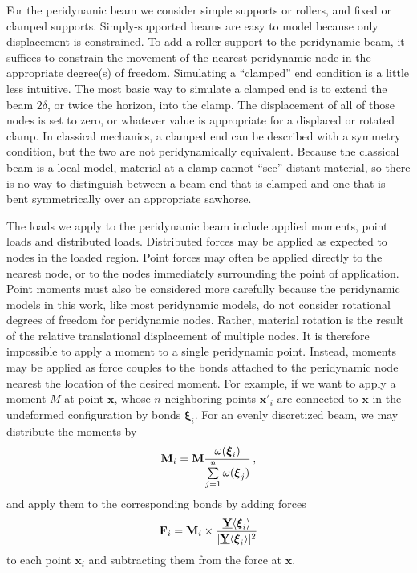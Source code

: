 For the peridynamic beam we consider simple supports or rollers, and fixed or clamped supports.
Simply-supported beams are easy to model because only displacement is constrained.
To add a roller support to the peridynamic beam, it suffices to constrain the movement of the nearest peridynamic node in the appropriate degree(s) of freedom.
Simulating a ``clamped'' end condition is a little less intuitive. 
The most basic way to simulate a clamped end is to extend the beam \(2\delta\), or twice the horizon, into the clamp. The displacement of all of those nodes is set to zero, or whatever value is appropriate for a displaced or rotated clamp.
In classical mechanics, a clamped end can be described with a symmetry condition, but the two are not peridynamically equivalent.
Because the classical beam is a local model, material at a clamp cannot ``see'' distant material, so there is no way to distinguish between a beam end that is clamped and one that is bent symmetrically over an appropriate sawhorse.

The loads we apply to the peridynamic beam include applied moments, point loads and distributed loads.
Distributed forces may be applied as expected to nodes in the loaded region.
Point forces may often be applied directly to the nearest node, or to the nodes immediately surrounding the point of application.
Point moments must also be considered more carefully because the peridynamic models in this work, like most peridynamic models, do not consider rotational degrees of freedom for peridynamic nodes.
Rather, material rotation is the result of the relative translational displacement of multiple nodes.
It is therefore impossible to apply a moment to a single peridynamic point.
Instead, moments may be applied as force couples to the bonds attached to the peridynamic node nearest the location of the desired moment.
For example, if we want to apply a moment $M$ at point $\mathbf{x}$, whose $n$ neighboring points $\mathbf{x}'_i$ are connected to $\mathbf{x}$ in the undeformed configuration by bonds $\boldsymbol{\xi}_i$.
For an evenly discretized beam, we may distribute the moments by
\begin{equation}
\mathbf{M}_i = \mathbf{M} \frac{\omega(\boldsymbol{\xi}_i)}{\sum\limits_{j=1}^n \omega(\boldsymbol{\xi}_j)}\, ,\notag
\end{equation}
and apply them to the corresponding bonds by adding forces
\begin{equation}
\mathbf{F}_i = \mathbf{M}_i \times \frac{\vstate{Y}{}{\boldsymbol{\xi}_i}}{|\vstate{Y}{}{\boldsymbol{\xi}_i}|^2}\notag
\end{equation}
to each point $\mathbf{x}_i$ and subtracting them from the force at $\mathbf{x}$.

